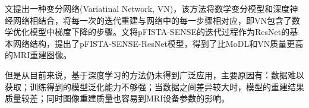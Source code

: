 \documentclass[UTF8]{article}
\begin{document}
\par 文\cite{hammernik2018learning}提出一种变分网络(Variatinal Network, VN)，该方法将数学变分模型和深度神经网络相结合，将每一次的迭代重建与网络中的每一步骤相对应，即VN包含了数学优化模型中梯度下降的步骤。文\cite{LU2020106790}将pFISTA-SENSE的迭代过程作为ResNet的基本网络结构，提出了pFISTA-SENSE-ResNet模型，得到了比MoDL和VN质量更高的MRI重建图像。
\par 但是从目前来说，基于深度学习的方法仍未得到广泛应用，主要原因有：数据难以获取；训练得到的模型泛化能力不够强；当数据之间差异较大时，模型的重建结果质量较差；同时图像重建质量也容易到MRI设备参数的影响。
\cite{LI2021332}

\newpage


\end{document}
